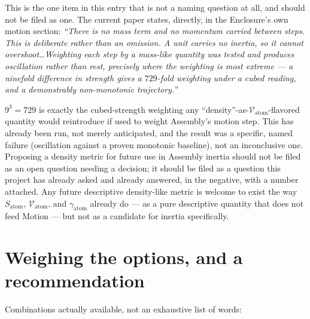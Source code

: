 \documentclass[11pt]{article}
\begin{document}
This is the one item in this entry that is not a naming question at
all, and should not be filed as one. The current paper states,
directly, in the Enclosure's own motion section: \emph{``There is no
mass term and no momentum carried between steps. This is deliberate
rather than an omission. A unit carries no inertia, so it cannot
overshoot\ldots Weighting each step by a mass-like quantity was
tested and produces oscillation rather than rest, precisely where
the weighting is most extreme --- a ninefold difference in strength
gives a $729$-fold weighting under a cubed reading, and a
demonstrably non-monotonic trajectory.''}

$9^3=729$ is exactly the cubed-strength weighting any
``density''-as-$\mathcal{V}_{\text{atom}}$-flavored quantity would
reintroduce if used to weight Assembly's motion step. This has
already been run, not merely anticipated, and the result was a
specific, named failure (oscillation against a proven monotonic
baseline), not an inconclusive one. Proposing a density metric for
future use in Assembly inertia should not be filed as an open
question needing a decision; it should be filed as a question this
project has already asked and already answered, in the negative,
with a number attached. Any future descriptive density-like metric
is welcome to exist the way $S_{\text{atom}}$, $\mathcal{V}_{\text{atom}}$,
and $\gamma_{\text{atom}}$ already do --- as a pure descriptive
quantity that does not feed Motion --- but not as a candidate for
inertia specifically.

\section{Weighing the options, and a recommendation}

Combinations actually available, not an exhaustive list of words:
\end{document}
